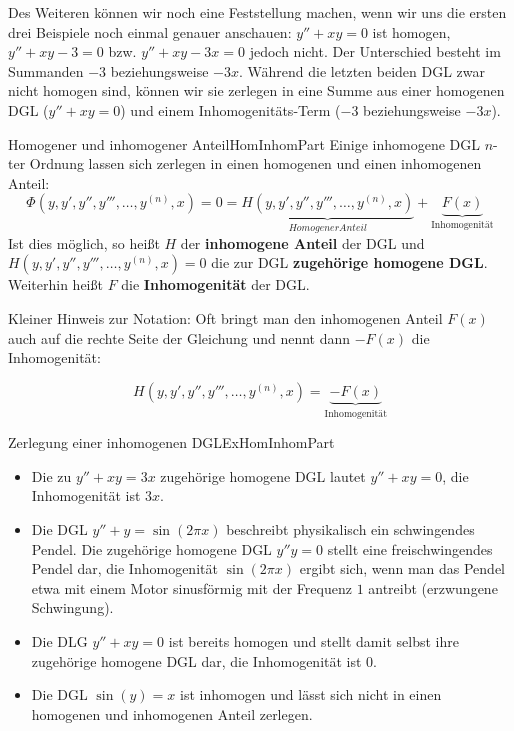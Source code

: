 Des Weiteren können wir noch eine Feststellung machen, wenn wir uns die ersten drei Beispiele noch einmal genauer anschauen: $y''+xy=0$ ist homogen, $y''+xy-3=0$ bzw. $y''+xy-3x=0$ jedoch nicht. Der Unterschied besteht im Summanden $-3$ beziehungsweise $-3x$. Während die letzten beiden DGL zwar nicht homogen sind, können wir sie zerlegen in eine Summe aus einer homogenen DGL ($y''+xy=0$) und einem Inhomogenitäts-Term ($-3$ beziehungsweise $-3x$).

\begin{definition}{Homogener und inhomogener Anteil}{HomInhomPart}
    Einige inhomogene DGL $n$-ter Ordnung lassen sich zerlegen in einen homogenen und einen inhomogenen Anteil:
    $$
        \Phi(y,y',y'',y''',\dots,y^{(n)},x) = 0 = \underbrace{H(y,y',y'',y''',\dots,y^{(n)},x)}_{Homogener Anteil} + \underbrace{F(x)}_{\text{Inhomogenität}}
    $$
    Ist dies möglich, so heißt $H$ der \textbf{inhomogene Anteil} der DGL und $H(y,y',y'',y''',\dots,y^{(n)},x) = 0$ die zur DGL \textbf{zugehörige homogene DGL}. Weiterhin heißt $F$ die \textbf{Inhomogenität} der DGL.
\end{definition}

Kleiner Hinweis zur Notation: Oft bringt man den inhomogenen Anteil $F(x)$ auch auf die rechte Seite der Gleichung und nennt dann $-F(x)$ die Inhomogenität:

$$
    H(y,y',y'',y''',\dots,y^{(n)},x) = \underbrace{-F(x)}_{\text{Inhomogenität}}
$$

\begin{example}{Zerlegung einer inhomogenen DGL}{ExHomInhomPart}
    \begin{itemize}
        \item Die zu $y''+xy=3x$ zugehörige homogene DGL lautet $y''+xy=0$, die Inhomogenität ist $3x$.
        \item Die DGL $y''+y = \sin(2 \pi x)$ beschreibt physikalisch ein schwingendes Pendel. Die zugehörige homogene DGL $y''y=0$ stellt eine freischwingendes Pendel dar, die Inhomogenität $\sin(2 \pi x)$ ergibt sich, wenn man das Pendel etwa mit einem Motor sinusförmig mit der Frequenz $1$ antreibt (erzwungene Schwingung).
        \item Die DLG $y''+xy=0$ ist bereits homogen und stellt damit selbst ihre zugehörige homogene DGL dar, die Inhomogenität ist $0$.
        \item Die DGL $\sin(y)=x$ ist inhomogen und lässt sich nicht in einen homogenen und inhomogenen Anteil zerlegen.
    \end{itemize}
\end{example}

